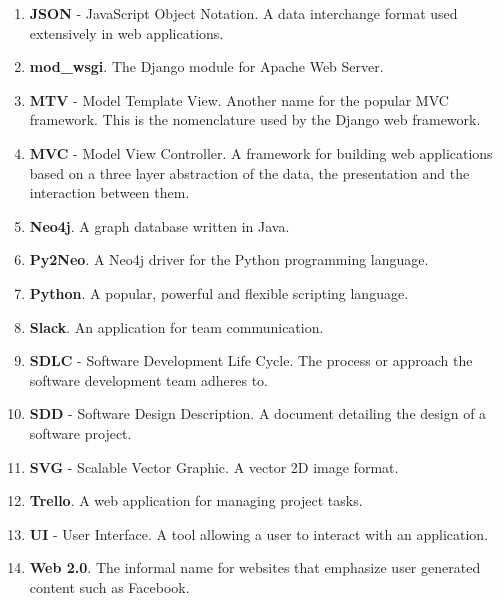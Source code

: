 \documentclass[12pt,onecolumn]{article}
\begin{document}
\begin{enumerate}
		\item \textbf{JSON} - JavaScript Object Notation. A data interchange format used extensively in web applications.
		
		\item \textbf{mod\_wsgi}. The Django module for Apache Web Server.
		
		\item \textbf{MTV} - Model Template View. Another name for the popular MVC framework. This is the nomenclature used by the Django web framework.
		
		\item \textbf{MVC} - Model View Controller. A framework for building web applications based on a three layer abstraction of the data, the presentation and the interaction between them. 
		
		\item \textbf{Neo4j}. A graph database written in Java.
		
		\item \textbf{Py2Neo}. A Neo4j driver for the Python programming language.
		
		\item \textbf{Python}. A popular, powerful and flexible scripting language.
		
		\item \textbf{Slack}. An application for team communication.
		
		\item \textbf{SDLC} - Software Development Life Cycle. The process or approach the software development team adheres to.
		
		\item \textbf{SDD} - Software Design Description. A document detailing the design of a software project.
		
		\item \textbf{SVG} - Scalable Vector Graphic. A vector 2D image format.
		
		\item \textbf{Trello}. A web application for managing project tasks.
		
		\item \textbf{UI} - User Interface. A tool allowing a user to interact with an application.
		
		\item \textbf{Web 2.0}. The informal name for websites that emphasize user generated content such as Facebook.
		
		
	\end{enumerate}
	
\end{document}

